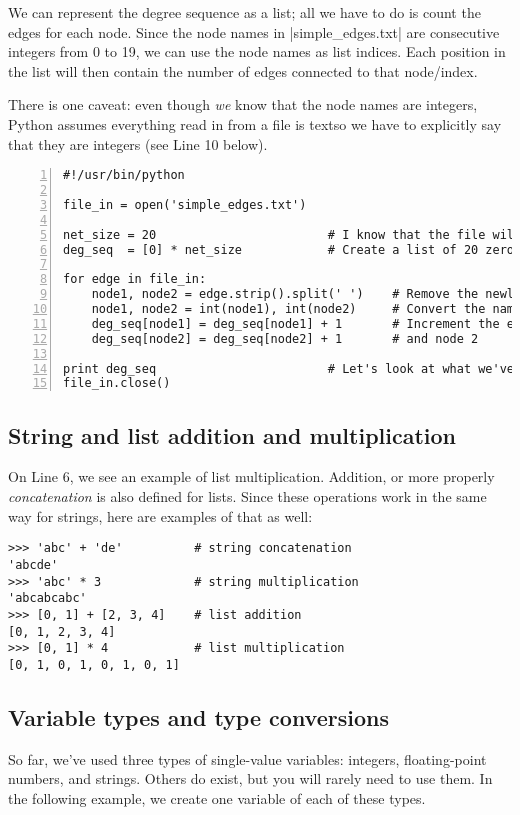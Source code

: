 \documentclass{article}
\begin{document}
We can represent the degree sequence as a list; all we have to do is count the edges for each node.  Since the node names in |simple_edges.txt| are 
consecutive integers from 0 to 19, we can use the node names as list indices.  Each position in the list will then contain the number of edges 
connected to that node/index.

There is one caveat: even though \textit{we} know that the node names are integers, Python assumes everything read in from a file is text\textemdash so we
have to explicitly say that they are integers (see Line 10 below).

\begin{Verbatim}[numbers=left, samepage=true]
#!/usr/bin/python

file_in = open('simple_edges.txt')

net_size = 20                        # I know that the file will have 20 nodes
deg_seq  = [0] * net_size            # Create a list of 20 zeros using list multiplication

for edge in file_in:
    node1, node2 = edge.strip().split(' ')    # Remove the newline, then split on spaces
    node1, node2 = int(node1), int(node2)     # Convert the names to integers
    deg_seq[node1] = deg_seq[node1] + 1       # Increment the edge count for node 1
    deg_seq[node2] = deg_seq[node2] + 1       # and node 2

print deg_seq                        # Let's look at what we've got
file_in.close()
\end{Verbatim}

\subsection{String and list addition and multiplication}
\label{str_add}
On Line 6, we see an example of list multiplication.  Addition, or more properly \textit{concatenation} is also defined for lists.  Since these
operations work in the same way for strings, here are examples of that as well:

\begin{Verbatim}[samepage=true]
>>> 'abc' + 'de'          # string concatenation
'abcde'
>>> 'abc' * 3             # string multiplication
'abcabcabc'
>>> [0, 1] + [2, 3, 4]    # list addition
[0, 1, 2, 3, 4]
>>> [0, 1] * 4            # list multiplication
[0, 1, 0, 1, 0, 1, 0, 1]
\end{Verbatim}

\subsection{Variable types and type conversions}
So far, we've used three types of single-value variables: integers, floating-point numbers, and strings.  Others do exist, but you will rarely need to
use them.  In the following example, we create one variable of each of these types.
\end{document}
